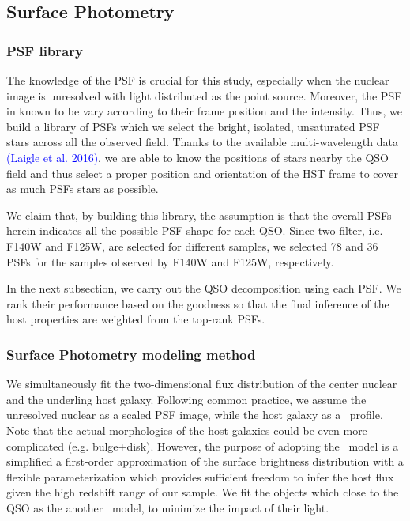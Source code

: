 \documentclass[apj]{emulateapj}
\begin{document}
\subsection{Surface Photometry}
\subsubsection{PSF library}    
\label{sec:psf_library}
The knowledge of the PSF is crucial for this study, especially when the nuclear image is unresolved with light distributed as the point source. Moreover, the PSF in known to be vary according to their frame position and the intensity. Thus, we build a library of PSFs which we select the bright, isolated, unsaturated PSF stars across all the observed field. Thanks to the available multi-wavelength data \textcolor{blue}{(Laigle et al. 2016)}, we are able to know the positions of stars nearby the QSO field and thus select a proper position and orientation of the HST frame to cover as much PSFs stars as possible. 

We claim that, by building this library, the assumption is that the overall PSFs herein indicates all the possible PSF shape for each QSO. Since two filter, i.e. F140W and F125W, are selected for different samples, we selected 78 and 36 PSFs for the samples observed by F140W and F125W, respectively.

In the next subsection, we carry out the QSO decomposition using each PSF. We rank their performance based on the goodness so that the final inference of the host properties are weighted from the top-rank PSFs.

\subsubsection{Surface Photometry modeling method}
We simultaneously fit the two-dimensional flux distribution of the center nuclear and the underling host galaxy. Following common practice, we assume the unresolved nuclear as a scaled PSF image, while the host galaxy as a \sersic\ profile. Note that the actual morphologies of the host galaxies could be even more complicated (e.g. bulge+disk). However, the purpose of adopting the \sersic\ model is a simplified a first-order approximation of the surface brightness distribution with a flexible parameterization which provides sufficient freedom to infer the host flux given the high redshift range of our sample. We fit the objects which close to the QSO as the another \sersic\ model, to minimize the impact of their light.
\end{document}

